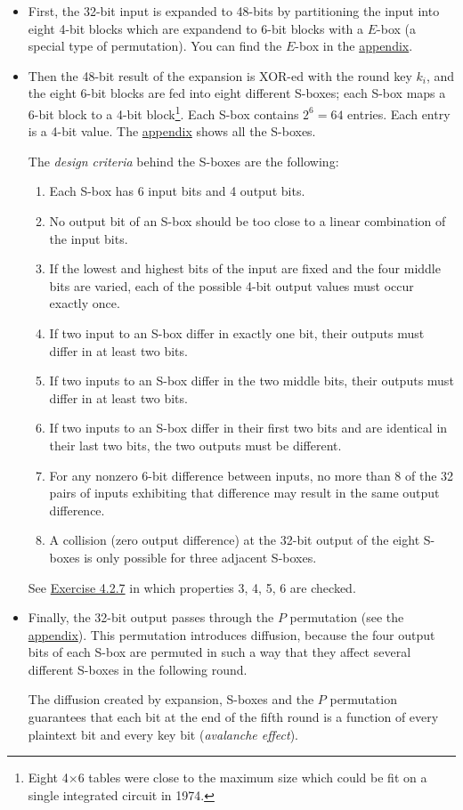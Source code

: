 \documentclass{article}
\begin{document}
  \begin{itemize}
	\item First, the 32-bit input is expanded to 48-bits by
	  partitioning the input into eight 4-bit blocks which are
	  expandend to 6-bit blocks with a $E$-box (a special type of
	  permutation). You can find the $E$-box in the
	  \hyperlink{appendix}{appendix}.

  
  \item Then the 48-bit result of the expansion is XOR-ed with the
	round key $k_{i}$, and the eight 6-bit blocks are fed into eight
	different S-boxes; each S-box maps a 6-bit block to a 4-bit
	block\footnote{Eight 4$\times$6 tables were close to the
	maximum size which could be fit on a single integrated circuit in
	1974.}.
	Each S-box contains $2^{6} = 64$ entries. Each entry is a 4-bit
	  value. The \hyperlink{appendix}{appendix} shows all the S-boxes.

	  The \emph{design criteria} behind the S-boxes are the following:
	  \begin{enumerate}
		\item Each S-box has 6 input bits and 4 output bits.
		\item No output bit of an S-box should be too close to a linear
		  combination of the input bits.
		\item If the lowest and highest bits of the input are fixed
		  and the four middle bits are varied, each of the possible
		  4-bit output values must occur exactly once.
		\item If two input to an S-box differ in exactly one bit,
		  their outputs must differ in at least two bits.
		\item If two inputs to an S-box differ in the two middle bits,
		  their outputs must differ in at least two bits.
		\item If two inputs to an S-box differ in their first two bits
		  and are identical in their last two bits, the two outputs
		  must be different.
		\item For any nonzero 6-bit difference between inputs, no more
		  than 8 of the 32 pairs of inputs exhibiting that difference
		  may result in the same output difference.
		\item A collision (zero output difference) at the 32-bit
		  output of the eight S-boxes is only possible for three
		  adjacent S-boxes.
	  \end{enumerate}

	  See \hyperlink{ex427}{Exercise 4.2.7} in which properties 3, 4,
	  5, 6 are checked.

	\item Finally, the 32-bit output passes through the $P$
	  permutation (see the \hyperlink{appendix}{appendix}).
	  This permutation introduces diffusion, because the four output
	  bits of each S-box are permuted in such a way that they affect
	  several different S-boxes in the following round.

	  The diffusion created by expansion, S-boxes and the $P$
	  permutation guarantees that each bit at the end of the fifth
	  round is a function of every plaintext bit and every key bit
	  (\emph{avalanche effect}).

  \end{itemize}
\end{document}
